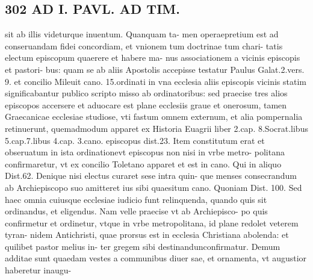 \documentclass{article}
\begin{document}
\begin{pages}
\section*{302 AD I. PAVL. AD TIM. }\pstart sit ab illis videturque inuentum. Quanquam ta- men operaepretium est ad conseruandam fidei concordiam, et vnionem tum doctrinae tum chari- tatis electum episcopum quaerere et habere ma- nus associationem a vicinis episcopis et pastori- bus: quam se ab aliis Apostolis accepisse testatur Paulus Galat.2.vers. 9. et concilio Mileuit cano. 15.ordinati in vna ecclesia aliis episcopis vicinis statim significabantur publico scripto misso ab ordinatoribus: sed praecise tres alios episcopos accersere et aduocare est plane ecclesiis graue et onerosum, tamen Graecanicae ecclesiae studiose, vti fastum omnem externum, et alia pompernalia retinuerunt, quemadmodum apparet ex Historia Euagrii liber 2.cap. 8.Socrat.libus 5.cap.7.libus 4.cap. 3.cano. episcopus dist.23.  \pend\pstart Item constitutum erat et obseruatum in ista ordinationevt episcopus non nisi in vrbe metro- politana confirmaretur, vt ex concilio Toletano apparet et est in cano. Qui in aliquo Dist.62.  \pend\pstart Denique nisi electus curaret sese intra quin- que menses consecrandum ab Archiepiscopo suo amitteret ius sibi quaesitum cano. Quoniam Dist. 100. Sed haec omnia cuiusque ecclesiae iudicio funt relinquenda, quando quis sit ordinandus, et eligendus. Nam velle praecise vt ab Archiepisco- po quis confirmetur et ordinetur, vtque in vrbe metropolitana, id plane redolet veterem tyran- nidem Antichristi, quae prorsus est in ecclesia Christiana abolenda: et quilibet pastor melius in- ter gregem sibi destinandunconfirmatur. Demum additae sunt quaedam vestes a communibus diuer sae, et ornamenta, vt augustior haberetur inaugu-  \pend

\end{pages}
\end{document}
